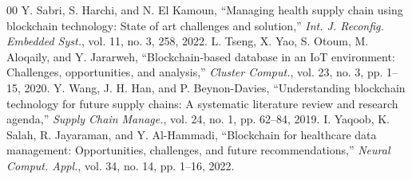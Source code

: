 \documentclass[conference]{IEEEtran}
\begin{document}
\begin{thebibliography}{00}
 Y. Sabri, S. Harchi, and N. El Kamoun, ``Managing health supply chain using blockchain technology: State of art challenges and solution,'' \textit{Int. J. Reconfig. Embedded Syst.}, vol. 11, no. 3, 258, 2022.
 L. Tseng, X. Yao, S. Otoum, M. Aloqaily, and Y. Jararweh, ``Blockchain-based database in an IoT environment: Challenges, opportunities, and analysis,'' \textit{Cluster Comput.}, vol. 23, no. 3, pp. 1--15, 2020.
 Y. Wang, J. H. Han, and P. Beynon-Davies, ``Understanding blockchain technology for future supply chains: A systematic literature review and research agenda,'' \textit{Supply Chain Manage.}, vol. 24, no. 1, pp. 62--84, 2019.
 I. Yaqoob, K. Salah, R. Jayaraman, and Y. Al-Hammadi, ``Blockchain for healthcare data management: Opportunities, challenges, and future recommendations,'' \textit{Neural Comput. Appl.}, vol. 34, no. 14, pp. 1--16, 2022.
\end{thebibliography}
\end{document}
